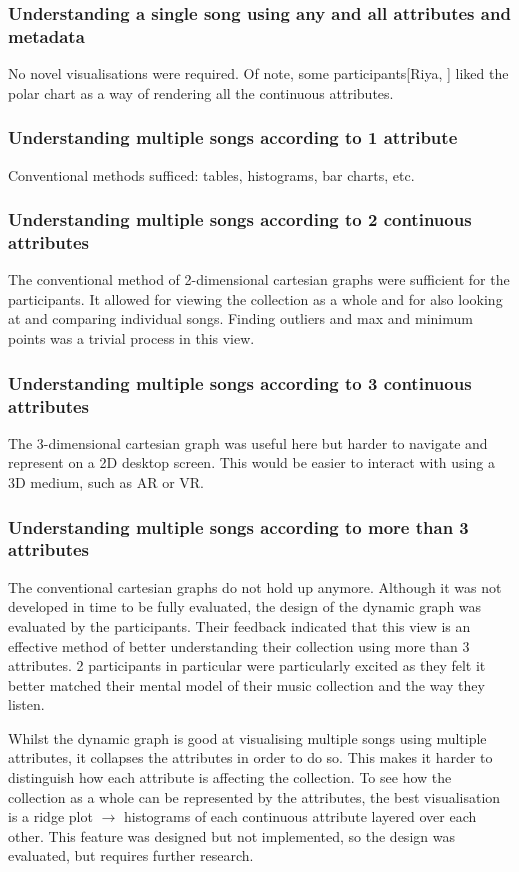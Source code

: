 \subsubsection{Understanding a single song using any and all attributes and metadata} No novel visualisations were required. Of note, some participants[Riya, ] liked the polar chart as a way of rendering all the continuous attributes.

\subsubsection{Understanding multiple songs according to 1 attribute}
Conventional methods sufficed: tables, histograms, bar charts, etc.

\subsubsection{Understanding multiple songs according to 2 continuous attributes} The conventional method of 2-dimensional cartesian graphs were sufficient for the participants. It allowed for viewing the collection as a whole and for also looking at and comparing individual songs. Finding outliers and max and minimum points was a trivial process in this view.

\subsubsection{Understanding multiple songs according to 3 continuous attributes} The 3-dimensional cartesian graph was useful here but harder to navigate and represent on a 2D desktop screen. This would be easier to interact with using a 3D medium, such as AR or VR.

\subsubsection{Understanding multiple songs according to more than 3 attributes} The conventional cartesian graphs do not hold up anymore. Although it was not developed in time to be fully evaluated, the design of the dynamic graph was evaluated by the participants. Their feedback indicated that this view is an effective method of better understanding their collection using more than 3 attributes. 2 participants in particular were particularly excited as they felt it better matched their mental model of their music collection and the way they listen.

Whilst the dynamic graph is good at visualising multiple songs using multiple attributes, it collapses the attributes in order to do so. This makes it harder to distinguish how each attribute is affecting the collection. To see how the collection as a whole can be represented by the attributes, the best visualisation is a ridge plot \(\to\) histograms of each continuous attribute layered over each other. This feature was designed but not implemented, so the design was evaluated, but requires further research.

